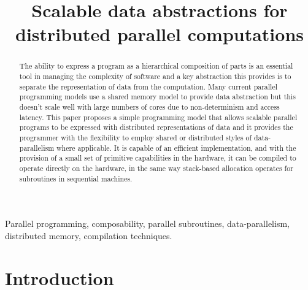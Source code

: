 \documentclass[11pt, conference, compsocconf, onecolumn]{IEEEtran}
\begin{document}
\title{Scalable data abstractions for distributed parallel computations}


\author{
}

\maketitle

\begin{abstract}

The ability to express a program as a hierarchical composition of parts is an
essential tool in managing the complexity of software and a key abstraction
this provides is to separate the representation of data from the computation. 
Many current parallel programming models use a shared memory model to provide
data abstraction but this doesn't scale well with large numbers of cores due to
non-determinism and access latency.
This paper proposes a simple programming model that allows scalable parallel
programs to be expressed with distributed representations of data and it
provides the programmer with the flexibility to employ shared or distributed
styles of data-parallelism where applicable.
It is capable of an efficient implementation, and with the provision of a small
set of primitive capabilities in the hardware, it can be compiled to operate
directly on the hardware, in the same way stack-based allocation operates for
subroutines in sequential machines.

\end{abstract}

\begin{IEEEkeywords}

Parallel programming, composability, parallel subroutines, data-parallelism,
distributed memory, compilation techniques.

\end{IEEEkeywords}


\IEEEpeerreviewmaketitle

\ifdefined\singlecol
  \setlength\parindent{0mm}
  \setlength\parskip{10pt}
\fi


\section{Introduction}
\end{document}
